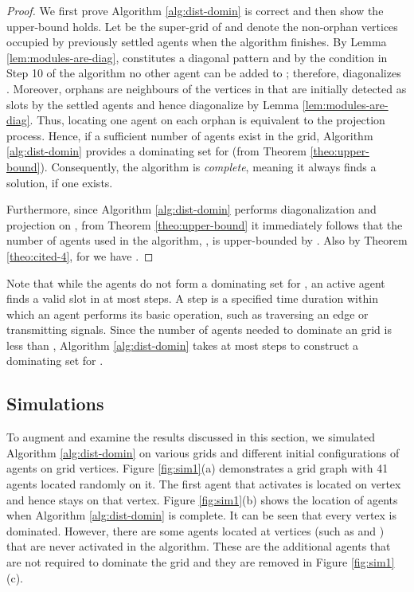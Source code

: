 \documentclass[letterpaper, 10pt, conference]{ieeeconf}
\theoremstyle{definition}
\theoremstyle{remark}
\begin{document}
\begin{proof}
We first prove Algorithm \ref{alg:dist-domin} is correct and then show the upper-bound holds. Let  be the super-grid of  and
 denote the non-orphan vertices occupied by previously settled agents when the algorithm finishes. By Lemma \ref{lem:modules-are-diag},  constitutes a diagonal pattern and by the condition in Step 10 of the algorithm no other agent can be added to ; therefore,  diagonalizes . Moreover, orphans are neighbours of the vertices in  that are initially detected as slots by the settled agents and hence diagonalize  by Lemma \ref{lem:modules-are-diag}. Thus, locating one agent on each orphan is equivalent to the projection process. Hence, if a sufficient number of agents exist in the grid, Algorithm \ref{alg:dist-domin} provides a dominating set for  (from Theorem \ref{theo:upper-bound}). Consequently, the algorithm is \emph{complete}, meaning it always finds a solution, if one exists.



Furthermore, since Algorithm \ref{alg:dist-domin} performs diagonalization and projection on , from Theorem \ref{theo:upper-bound} it immediately follows that the number of agents used in the algorithm, , is upper-bounded by . Also by Theorem \ref{theo:cited-4}, for  we have .
\end{proof}


Note that while the agents do not form a dominating set for , an active agent finds a valid slot in at most  steps. A step is a specified time duration within which an agent performs its basic operation, such as traversing an edge or transmitting signals. Since the number of agents needed to dominate an  grid is less than , Algorithm \ref{alg:dist-domin} takes at most  steps to construct a dominating set for .


\subsection{Simulations}
\label{subsec:simulation}
To augment and examine the results discussed in this section, we simulated Algorithm \ref{alg:dist-domin} on various grids and different initial configurations of agents on grid vertices. Figure \ref{fig:sim1}(a) demonstrates a  grid graph with 41 agents located randomly on it. The first agent that activates is located on vertex  and hence stays on that vertex. Figure \ref{fig:sim1}(b) shows the location of agents when Algorithm \ref{alg:dist-domin} is complete. It can be seen that every vertex is dominated. However, there are some agents located at vertices (such as  and ) that are never activated in the algorithm. These are the additional agents that are not required to dominate the grid and they are removed in Figure \ref{fig:sim1}(c).
\end{document}
